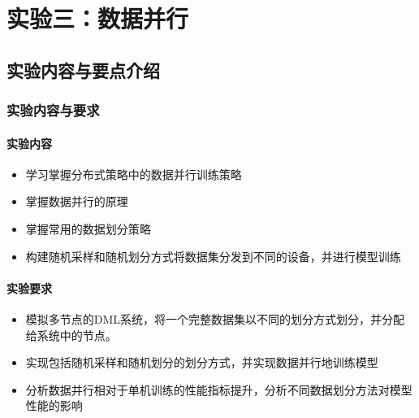 \chapter{实验三：数据并行}

\section{实验内容与要点介绍}

\subsection{实验内容与要求}

\subsubsection{实验内容}
\begin{itemize}
    \item 学习掌握分布式策略中的数据并行训练策略
    \item 掌握数据并行的原理
    \item 掌握常用的数据划分策略
    \item 构建随机采样和随机划分方式将数据集分发到不同的设备，并进行模型训练
\end{itemize}


\subsubsection{实验要求}
\begin{itemize}
    \item 模拟多节点的DML系统，将一个完整数据集以不同的划分方式划分，并分配给系统中的节点。
    \item 实现包括随机采样和随机划分的划分方式，并实现数据并行地训练模型
    \item 分析数据并行相对于单机训练的性能指标提升，分析不同数据划分方法对模型性能的影响
\end{itemize}


\subsection{}